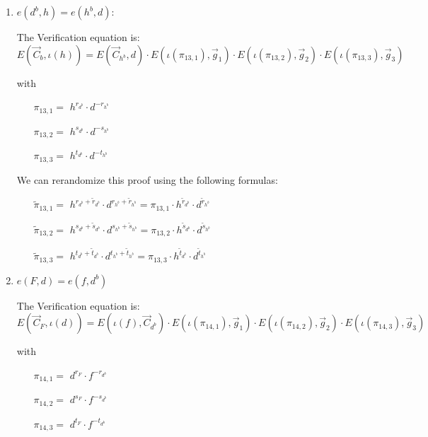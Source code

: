 \begin{description}
\begin{enumerate}
  \item \label{relationhd}
    $e(\boxed{d^b},h) = e(\boxed{h^b}, d)$: 

    The Verification equation is: $E(\vec{C}_b, \iota(h)) = E(\vec{C}_{h^b}, d) \cdot E(\iota(\pi_{13,1}), \vec{g}_1)\cdot E(\iota(\pi_{13,2}), \vec{g}_2)\cdot E(\iota(\pi_{13,3}), \vec{g}_3)$

    with
    \begin{itemize}
    \item[$\pi_{13,1} = $] $h^{r_{d^b}} \cdot d^{-r_{h^b}}$
    \item[$\pi_{13,2} = $] $h^{s_{d^b}} \cdot d^{-s_{h^b}}$
    \item[$\pi_{13,3} = $] $h^{t_{d^b}} \cdot d^{-t_{h^b}}$
    \end{itemize}

    We can rerandomize this proof using the following formulas:

    \begin{itemize}
    \item[$\tilde{\pi}_{13,1} = $] $h^{r_{d^b}+\tilde{r}_{d^b}} \cdot d^{r_{h^b}+\tilde{r}_{h^b}} = \pi_{13,1} \cdot h^{\tilde{r}_{d^b}} \cdot d^{\tilde{r}_{h^b}}$
    \item[$\tilde{\pi}_{13,2} = $] $h^{s_{d^b}+\tilde{s}_{d^b}} \cdot d^{s_{h^b}+\tilde{s}_{h^b}} = \pi_{13,2} \cdot h^{\tilde{s}_{d^b}} \cdot d^{\tilde{s}_{h^b}}$
    \item[$\tilde{\pi}_{13,3} = $] $h^{t_{d^b}+\tilde{t}_{d^b}} \cdot d^{t_{h^b}+\tilde{t}_{h^b}} = \pi_{13,3} \cdot h^{\tilde{t}_{d^b}} \cdot d^{\tilde{t}_{h^b}}$
    \end{itemize}


  \item \label{relationfd}
    $e(\boxed{F},d) = e(f, \boxed{d^b})$

    The Verification equation is: $E(\vec{C}_F, \iota(d)) = E(\iota(f), \vec{C}_{d^b}) \cdot E(\iota(\pi_{14,1}), \vec{g}_1)\cdot E(\iota(\pi_{14,2}), \vec{g}_2)\cdot E(\iota(\pi_{14,3}), \vec{g}_3)$

    with

    \begin{itemize}
    \item[$\pi_{14,1} = $] $d^{r_F} \cdot f^{-r_{d^b}}$    
    \item[$\pi_{14,2} = $] $d^{s_F} \cdot f^{-s_{d^b}}$    
    \item[$\pi_{14,3} = $] $d^{t_F} \cdot f^{-t_{d^b}}$
    \end{itemize}


\end{enumerate}
\end{description}
